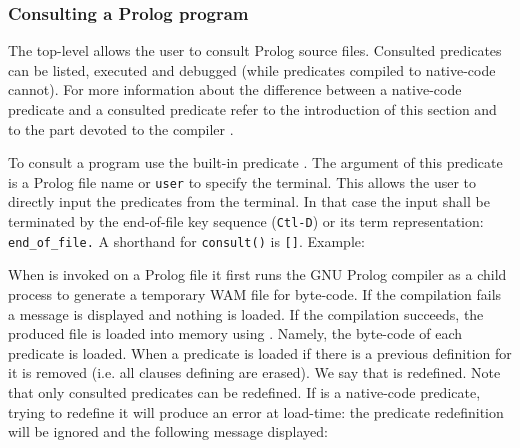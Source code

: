 \subsubsection{Consulting a Prolog program}
\label{Consulting-a-Prolog-program}
The top-level allows the user to consult Prolog source files. Consulted
predicates can be listed, executed and debugged (while predicates compiled
to native-code cannot). For more information about the difference between a
native-code predicate and a consulted predicate refer to the introduction of
this section  and to the part devoted
to the compiler .

To consult a program use the built-in predicate 
. The argument of this predicate is a Prolog file name or
\texttt{user} to specify the terminal. This allows the user to directly input
the predicates from the terminal. In that case the input shall be terminated
by the end-of-file key sequence (\texttt{Ctl-D}) or its term representation:
\texttt{end\_of\_file.} A shorthand for
\texttt{consult(}\texttt{)} is
\texttt{[}\texttt{]}. Example:

\begin{CodeTwoCols}
\SkipLine
{}
\SkipLine
{}
\SkipLine
{}
\SkipLine
{}
\SkipLine
{}
\SkipLine
{}
\end{CodeTwoCols}

When   is invoked on a Prolog file it
first runs the GNU Prolog compiler  as a child
process to generate a temporary WAM file for byte-code. If the compilation
fails a message is displayed and nothing is loaded. If the compilation
succeeds, the produced file is loaded into memory using 
. Namely, the byte-code of each predicate is loaded. When a
predicate  is loaded if there is a previous definition
for  it is removed (i.e. all clauses defining
 are erased). We say that  is
redefined. Note that only consulted predicates can be redefined. If
 is a native-code predicate, trying to redefine it will
produce an error at load-time: the predicate redefinition will be ignored
and the following message displayed:

